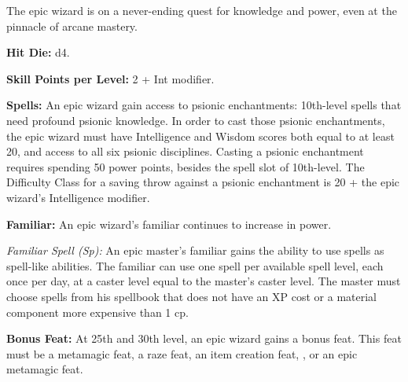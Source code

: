 The epic wizard is on a never-ending quest for knowledge and power, even at the pinnacle of arcane mastery. 

\textbf{Hit Die:} d4.

\textbf{Skill Points per Level:} 2 + Int modifier.

\textbf{Spells:} An epic wizard gain access to psionic enchantments: 10th-level spells that need profound psionic knowledge. In order to cast those psionic enchantments, the epic wizard must have Intelligence and Wisdom scores both equal to at least 20, and access to all six psionic disciplines. Casting a psionic enchantment requires spending 50 power points, besides the spell slot of 10th-level. The Difficulty Class for a saving throw against a psionic enchantment is 20 + the epic wizard's Intelligence modifier.

\textbf{Familiar:} An epic wizard's familiar continues to increase in power.


\textit{Familiar Spell (Sp):} An epic master's familiar gains the ability to use spells as spell-like abilities. The familiar can use one spell per available spell level, each once per day, at a caster level equal to the master's caster level. The master must choose spells from his spellbook that does not have an XP cost or a material component more expensive than 1 cp.

\textbf{Bonus Feat:} At 25th and 30th level, an epic wizard gains a bonus feat. This feat must be a metamagic feat, a raze feat, an item creation feat, , or an epic metamagic feat.


\clearpage

\clearpage

\clearpage

